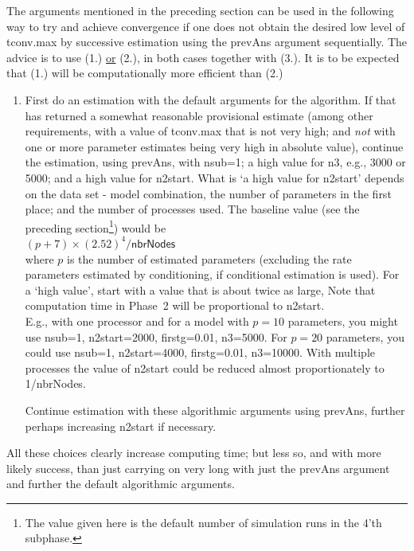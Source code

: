 \documentclass[a4paper,fleqn,11pt]{article}
\newcommand{\+}{\, + \,}
\newcommand{\sfn}[1]{\textsf{#1}}
\begin{document}
The arguments mentioned in the preceding section can be used in the following way
to try and achieve convergence if one does not obtain the desired low level
of \sfn{tconv.max} by successive estimation using the \sfn{prevAns}
argument sequentially.
The advice is to use (1.) \underline{or} (2.), in both cases together with (3.).
It is to be expected that (1.) will be computationally more efficient than (2.)

\begin{enumerate}
\item First do an estimation with the default arguments
    for the algorithm.
    If that has returned a somewhat reasonable provisional estimate
    (among other requirements, with a value of \sfn{tconv.max} that is
    not very high; and \emph{not} with one or more parameter estimates
    being very high in absolute value), continue the estimation, using \sfn{prevAns},
    with \sfn{nsub=1}; a high value for \sfn{n3}, e.g., 3000 or 5000;
    and a high value for \sfn{n2start}.
    What is `a high value for \sfn{n2start}' depends on the data set
    - model combination,
    the number of parameters in the first place;
    and the number of processes used.
    The baseline value (see the preceding section\footnote{The value given here
    is the default number of simulation runs in the 4'th subphase.})
    would be \\
    $(p+7)\times (2.52)^4 / \sfn{nbrNodes}$ \\
    where $p$ is the
    number of estimated parameters (excluding the rate parameters
    estimated by conditioning, if conditional estimation is used).
    For a `high value', start with a value that is about twice as large,
    Note that computation time in Phase~2 will be proportional to \sfn{n2start}.\\
    E.g., with one processor and
    for a model with $p=10$ parameters, you might use
    \sfn{nsub=1}, \sfn{n2start=2000}, \sfn{firstg=0.01}, \sfn{n3=5000}.
    For $p=20$ parameters, you could use
    \sfn{nsub=1}, \sfn{n2start=4000}, \sfn{firstg=0.01}, \sfn{n3=10000}.
    With multiple processes the value of \sfn{n2start} could be
    reduced almost proportionately to \sfn{1/nbrNodes}.

    Continue estimation with these algorithmic arguments using \sfn{prevAns},
    further perhaps increasing \sfn{n2start} if necessary.
\end{enumerate}

All these choices clearly increase computing time; but less so, and with
more likely success, than just carrying on very long with just the
\sfn{prevAns} argument and further the default algorithmic arguments.
\end{document}
